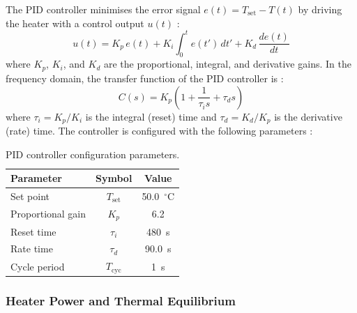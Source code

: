 The PID controller minimises the error signal $e(t) = T_{\text{set}} - T(t)$ by
driving the heater with a control output $u(t)$ :
\begin{equation}
    u(t) = K_p\,e(t)
         + K_i\int_0^t e(t')\,dt'
         + K_d\,\frac{de(t)}{dt}
\end{equation}
where $K_p$, $K_i$, and $K_d$ are the proportional, integral, and derivative gains.
In the frequency domain, the transfer function of the PID controller is :
\begin{equation}
    C(s) = K_p\left(1 + \frac{1}{\tau_i s} + \tau_d s\right)
\end{equation}
where $\tau_i = K_p/K_i$ is the integral (reset) time and $\tau_d = K_d/K_p$ is the
derivative (rate) time. The controller is configured with the following parameters :

\begin{table}[h]
    \centering
    \begin{tabular}{lcc}
        \hline
        Parameter & Symbol & Value \\
        \hline
        Set point               & $T_{\text{set}}$ & 50.0~$^\circ$C \\
        Proportional gain       & $K_p$            & 6.2 \\
        Reset time              & $\tau_i$         & 480~s \\
        Rate time               & $\tau_d$         & 90.0~s \\
        Cycle period            & $T_{\text{cyc}}$ & 1~s \\
        \hline
    \end{tabular}
    \caption{PID controller configuration parameters.}
\end{table}

\subsubsection*{Heater Power and Thermal Equilibrium}

